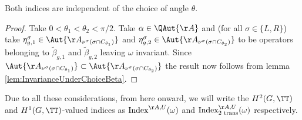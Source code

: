 \begin{lemma}
	Both indices are independent of the choice of angle $\theta$.
\end{lemma}
\begin{proof}
	Take $0<\theta_1<\theta_2<\pi/2$. Take $\alpha\in \QAut{\AA}$ and (for all $\sigma\in\{L,R\}$) take $\eta_{g,1}^\sigma\in\Aut{\AA_{\nu^{\sigma}(\sigma\cap C_{\theta_1})}}$ and $\eta_{g,2}^\sigma\in\Aut{\AA_{\nu^{\sigma}(\sigma\cap C_{\theta_2})}}$ to be operators belonging to $\tilde{\beta}_{g,1}$ and $\tilde{\beta}_{g,2}$ leaving $\omega$ invariant. Since $\Aut{\AA_{\nu^{\sigma}(\sigma\cap C_{\theta_1})}}\subset \Aut{\AA_{\nu^{\sigma}(\sigma\cap C_{\theta_2})}}$ the result now follows from lemma \ref{lem:InvarianceUnderChoiceBeta}.
\end{proof}
Due to all these considerations, from here onward, we will write the $H^2(G,\TT)$ and $H^1(G,\TT)$-valued indices as $\textrm{Index}^{\AA,U}(\omega)$ and $\textrm{Index}^{\AA,U}_{\text{2 trans}}(\omega)$ respectively.
